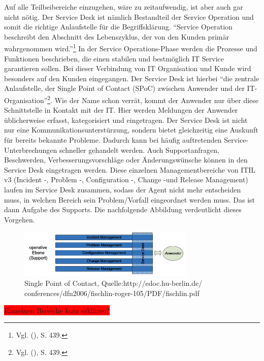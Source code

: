 \noindent
Auf alle Teilbeibereiche einzugehen, wäre zu zeitaufwendig, ist aber auch gar nicht nötig. Der Service Desk ist nämlich Bestandteil der Service Operation und somit die richtige Anlaufstelle für die Begriffsklärung. \newline \enquote{Service Operation beschreibt den Abschnitt des Lebenszyklus, der von den Kunden primär wahrgenommen wird.}\footnote{Vgl. \citeauthor{Ebel} (\citeyear{Ebel}), S. 439.} In der Service Operations-Phase werden die Prozesse und Funktionen beschrieben, die einen stabilen  und bestmöglich IT Service garantieren sollen. Bei dieser Verbindung von IT Organisation und Kunde wird besonders auf den Kunden eingegangen. Der Service Desk ist hierbei \enquote{die zentrale Anlaufstelle, der Single Point of Contact (SPoC) zwischen Anwender und der IT-Organisation}\footnote{Vgl. \citeauthor{Ebel} (\citeyear{Ebel}), S. 439.}. Wie der Name schon verrät, kommt der Anwender nur über diese Schnittstelle in Kontakt mit der IT. Hier werden Meldungen der Anwender üblicherweise erfasst, kategorisiert und eingetragen. Der Service Desk ist nicht nur eine Kommunikationsunterstürzung, sondern bietet gleichzeitig eine Auskunft für bereits bekannte Probleme. Dadurch kann bei häufig auftretenden Service-Unterbrechungen schneller gehandelt werden. Auch Supportanfragen, Beschwerden, Verbesserungsvorschläge oder Änderungswünsche können in den Service Desk eingetragen werden. Diese einzelnen Managementbereiche von ITIL v3 (Incident -, Problem -, Configuration -, Change -und Release Management) laufen im Service Desk zusammen, sodass der Agent  nicht mehr entscheiden muss, in welchen Bereich sein Problem/Vorfall eingeordnet werden muss. Das ist dann Aufgabe des Supports. Die nachfolgende Abbildung verdeutlicht dieses Vorgehen.

\begin{figure}[h!]
\centering
	\includegraphics[width=0.75\textwidth]{Abbildungen/SPOC_2.png}
	\caption[Single Point of Contact]{Single Point of Contact, Quelle:http://edoc.hu-berlin.de/
	conferences/dfn2006/fischlin-roger-105/PDF/fischlin.pdf}
	\label{fig:ITIL_Lebenyzyklus}
\end{figure}


\colorbox{red}{Einzelnen Bereiche kurz erklären?}

